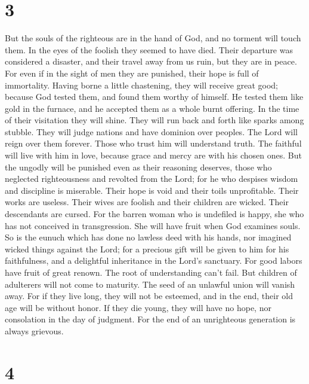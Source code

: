 \hypertarget{section-1}{%
\section{3}\label{section-1}}

 But the souls of the righteous are in the hand of God, and
no torment will touch them.  In the eyes of the foolish they
seemed to have died. Their departure was considered a disaster,
 and their travel away from us ruin, but they are in peace.
 For even if in the sight of men they are punished, their
hope is full of immortality.  Having borne a little
chastening, they will receive great good; because God tested them, and
found them worthy of himself.  He tested them like gold in
the furnace, and he accepted them as a whole burnt offering.
 In the time of their visitation they will shine. They will
run back and forth like sparks among stubble.  They will
judge nations and have dominion over peoples. The Lord will reign over
them forever.  Those who trust him will understand truth.
The faithful will live with him in love, because grace and mercy are
with his chosen ones.  But the ungodly will be punished
even as their reasoning deserves, those who neglected righteousness and
revolted from the Lord;  for he who despises wisdom and
discipline is miserable. Their hope is void and their toils
unprofitable. Their works are useless.  Their wives are
foolish and their children are wicked.  Their descendants
are cursed. For the barren woman who is undefiled is happy, she who has
not conceived in transgression. She will have fruit when God examines
souls.  So is the eunuch which has done no lawless deed
with his hands, nor imagined wicked things against the Lord; for a
precious gift will be given to him for his faithfulness, and a
delightful inheritance in the Lord's sanctuary.  For good
labors have fruit of great renown. The root of understanding can't fail.
 But children of adulterers will not come to maturity. The
seed of an unlawful union will vanish away.  For if they
live long, they will not be esteemed, and in the end, their old age will
be without honor.  If they die young, they will have no
hope, nor consolation in the day of judgment.  For the end
of an unrighteous generation is always grievous.

\hypertarget{section-2}{%
\section{4}\label{section-2}}

